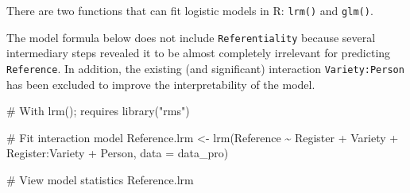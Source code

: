 \documentclass[
  11pt,
  letterpaper,
  DIV=11,
  numbers=noendperiod]{scrreprt}
\newenvironment{Shaded}{\begin{snugshade}}{\end{snugshade}}
\newcommand{\AttributeTok}[1]{\textcolor[rgb]{0.40,0.45,0.13}{#1}}
\newcommand{\CommentTok}[1]{\textcolor[rgb]{0.37,0.37,0.37}{#1}}
\newcommand{\FunctionTok}[1]{\textcolor[rgb]{0.28,0.35,0.67}{#1}}
\newcommand{\NormalTok}[1]{\textcolor[rgb]{0.00,0.23,0.31}{#1}}
\newcommand{\OtherTok}[1]{\textcolor[rgb]{0.00,0.23,0.31}{#1}}
\newcommand{\SpecialCharTok}[1]{\textcolor[rgb]{0.37,0.37,0.37}{#1}}
\begin{document}
There are two functions that can fit logistic models in R:
\texttt{lrm()} and \texttt{glm()}.

\begin{tcolorbox}[enhanced jigsaw, toprule=.15mm, opacitybacktitle=0.6, coltitle=black, arc=.35mm, colback=white, title=\textcolor{quarto-callout-note-color}{\faInfo}\hspace{0.5em}{Note}, titlerule=0mm, toptitle=1mm, bottomtitle=1mm, breakable, rightrule=.15mm, opacityback=0, bottomrule=.15mm, leftrule=.75mm, colframe=quarto-callout-note-color-frame, left=2mm, colbacktitle=quarto-callout-note-color!10!white]

The model formula below does not include \texttt{Referentiality} because
several intermediary steps revealed it to be almost completely
irrelevant for predicting \texttt{Reference}. In addition, the existing
(and significant) interaction \texttt{Variety:Person} has been excluded
to improve the interpretability of the model.

\end{tcolorbox}

\begin{Shaded}
\begin{Highlighting}[]
\CommentTok{\# With lrm(); requires library("rms")}

\CommentTok{\# Fit interaction model}
\NormalTok{Reference.lrm }\OtherTok{\textless{}{-}} \FunctionTok{lrm}\NormalTok{(Reference }\SpecialCharTok{\textasciitilde{}}\NormalTok{ Register }\SpecialCharTok{+}\NormalTok{ Variety }\SpecialCharTok{+}\NormalTok{ Register}\SpecialCharTok{:}\NormalTok{Variety }\SpecialCharTok{+}\NormalTok{ Person, }\AttributeTok{data =}\NormalTok{ data\_pro)}

\CommentTok{\# View model statistics}
\NormalTok{Reference.lrm}
\end{Highlighting}
\end{Shaded}
\end{document}
